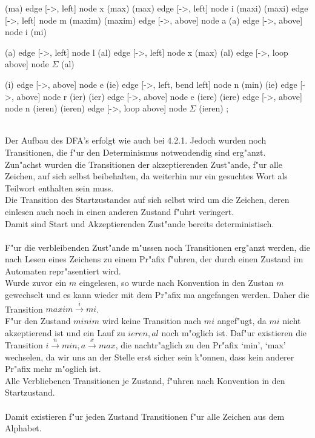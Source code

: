 \documentclass{article}
\newcommand{\rao}[1]{\overset{#1}{\rightarrow}}
\begin{document}
{        (ma)
            edge [->, left] node {x} (max)
        (max)
            edge [->, left] node {i} (maxi)
        (maxi)
            edge [->, left] node {m} (maxim)
        (maxim)
            edge [->, above] node {a} (a)
            edge [->, above] node {i} (mi)

        (a)
            edge [->, left] node {l} (al)
            edge [->, left] node {x} (max)
        (al)
            edge [->, loop above] node {$\Sigma$} (al)

        (i)
            edge [->, above] node {e} (ie)
            edge [->, left, bend left] node {n} (min)
        (ie)
            edge [->, above] node {r} (ier)
        (ier)
            edge [->, above] node {e} (iere)
        (iere)
            edge [->, above] node {n} (ieren)
        (ieren)
            edge [->, loop above] node {$\Sigma$} (ieren)
    ;}\\
Der Aufbau des DFA's erfolgt wie auch bei 4.2.1. Jedoch wurden noch 
    Transitionen, die f"ur den Determinismus notwendendig sind erg"anzt.\\
Zun"achst wurden die Transitionen der akzeptierenden Zust"ande, f"ur alle 
    Zeichen, auf sich selbst beibehalten, da weiterhin nur ein gesuchtes 
    Wort als Teilwort enthalten sein muss.\\
Die Transition des Startzustandes auf sich selbst wird um die Zeichen, deren 
    einlesen auch noch in einen anderen Zustand f"uhrt veringert.\\
Damit sind Start und Akzeptierenden Zust"ande bereits deterministisch.\\
\\
F"ur die verbleibenden Zust"ande m"ussen noch Transitionen erg"anzt werden, die
    nach Lesen eines Zeichens zu einem Pr"afix f"uhren, der durch einen Zustand
    im Automaten repr"asentiert wird.\\
Wurde zuvor ein $m$ eingelesen, so wurde nach Konvention in den Zustan $m$ 
    gewechselt und es kann wieder mit dem Pr"afix ma
    angefangen werden.
    Daher die Transition
    $maxim \rao{i} mi$.\\
F"ur den Zustand $minim$ wird keine Transition nach $mi$ angef"ugt, 
    da $mi$ nicht akzeptierend ist und ein Lauf zu $ieren, al$ noch 
    m"oglich ist.
    Daf"ur existieren die Transition $i \rao{n} min, a \rao{x} max$, 
    die nachtr"aglich zu den
    Pr"afix `min', `max' wechselen, da wir uns an der Stelle erst sicher sein 
    k"onnen, dass kein anderer Pr"afix mehr m"oglich ist.\\
Alle Verbliebenen Transitionen je Zustand, f"uhren nach Konvention in den 
    Startzustand.\\
\\
Damit existieren f"ur jeden Zustand Transitionen f"ur alle Zeichen aus dem 
    Alphabet.\\
\end{document}
